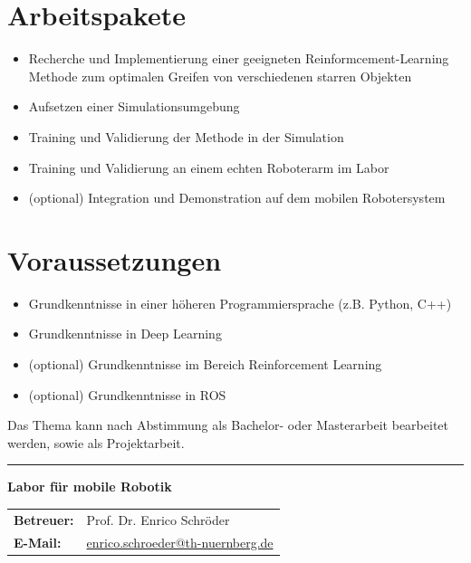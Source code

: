 \documentclass{ohm_project_description}
\begin{document}
\section*{Arbeitspakete}
\begin{itemize}[leftmargin=0.5cm]
    \setlength\itemsep{.1em}
    \item Recherche und Implementierung einer geeigneten Reinformcement-Learning Methode zum optimalen Greifen von verschiedenen starren Objekten
    \item Aufsetzen einer Simulationsumgebung
    \item Training und Validierung der Methode in der Simulation
    \item Training und Validierung an einem echten Roboterarm im Labor
    \item (optional) Integration und Demonstration auf dem mobilen Robotersystem 
\end{itemize}

\section*{Voraussetzungen}
\begin{itemize}[leftmargin=0.5cm]
    \setlength\itemsep{.1em}
    \item Grundkenntnisse in einer höheren Programmiersprache (z.B. Python, C++)
    \item Grundkenntnisse in Deep Learning
    \item (optional) Grundkenntnisse im Bereich Reinforcement Learning
    \item (optional) Grundkenntnisse in ROS
\end{itemize}

\vspace{0.5cm}
Das Thema kann nach Abstimmung als Bachelor- oder Masterarbeit bearbeitet werden, sowie als Projektarbeit. 


\vfill
\textcolor{ohm_red}{\rule{\linewidth}{0.4mm}}
\textbf{\textcolor{ohm_red}{Labor für mobile Robotik}} \\
\begin{tabular}{@{}ll}
\textbf{Betreuer:} & Prof. Dr. Enrico Schröder \\
\textbf{E-Mail:}   & \href{mailto:enrico.schroeder@th-nuernberg.de}{enrico.schroeder@th-nuernberg.de} \\
\end{tabular}
\end{document}
